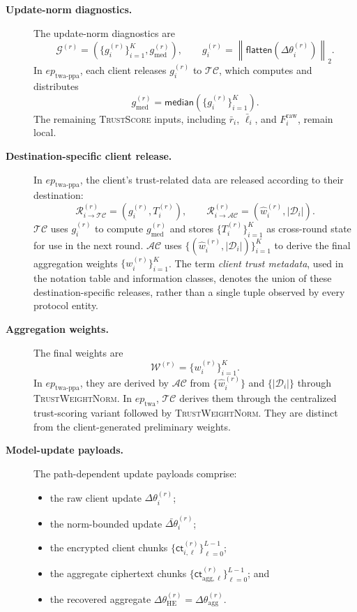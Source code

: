 \documentclass{article}
\begin{document}
\begin{description}
  \item[\textbf{Update-norm diagnostics.}]
  The update-norm diagnostics are
  \[
  \mathcal{G}^{(r)}
  =
  \left(
  \{g_i^{(r)}\}_{i=1}^{K},
  g_{\mathrm{med}}^{(r)}
  \right),
  \qquad
  g_i^{(r)}
  =
  \left\|
  \mathsf{flatten}(\Delta\theta_i^{(r)})
  \right\|_2.
  \]
  In $ep_{\mathrm{twa\text{-}ppa}}$, each client releases
  $g_i^{(r)}$ to $\mathcal{TC}$, which computes and distributes
  \[
  g_{\mathrm{med}}^{(r)}
  =
  \mathsf{median}
  \left(
  \{g_i^{(r)}\}_{i=1}^{K}
  \right).
  \]
  The remaining \textsc{TrustScore} inputs, including
  $\bar r_i$, $\bar\ell_i$, and $F_i^{\mathrm{raw}}$, remain local.

  \item[\textbf{Destination-specific client release.}]
  In $ep_{\mathrm{twa\text{-}ppa}}$, the client's trust-related data are
  released according to their destination:
  \[
  \mathcal{R}_{i\rightarrow\mathcal{TC}}^{(r)}
  =
  \left(
  g_i^{(r)},
  T_i^{(r)}
  \right),
  \qquad
  \mathcal{R}_{i\rightarrow\mathcal{AC}}^{(r)}
  =
  \left(
  \hat{w}_i^{(r)},
  |\mathcal{D}_i|
  \right).
  \]
  $\mathcal{TC}$ uses $g_i^{(r)}$ to compute
  $g_{\mathrm{med}}^{(r)}$ and stores $\{T_i^{(r)}\}_{i=1}^{K}$ as cross-round state for
  use in the next round. $\mathcal{AC}$ uses $\{(\hat w_i^{(r)},|\mathcal{D}_i|)\}_{i=1}^{K}$
  to derive the final aggregation weights $\{w_i^{(r)}\}_{i=1}^{K}$. The term
  \emph{client trust metadata}, used in the notation table and information classes,
  denotes the union of these destination-specific
  releases, rather than a single tuple observed by every protocol entity.

  \item[\textbf{Aggregation weights.}]
  The final weights are
  \[
  \mathcal{W}^{(r)}
  =
  \{w_i^{(r)}\}_{i=1}^{K}.
  \]
  In $ep_{\mathrm{twa\text{-}ppa}}$, they are derived by $\mathcal{AC}$
  from $\{\hat{w}_i^{(r)}\}$ and $\{|\mathcal{D}_i|\}$ through
  \textsc{TrustWeightNorm}. In $ep_{\mathrm{twa}}$, $\mathcal{TC}$ derives
  them through the centralized trust-scoring variant followed by
  \textsc{TrustWeightNorm}. They are distinct from the client-generated
  preliminary weights.

  \item[\textbf{Model-update payloads.}]
  The path-dependent update payloads comprise:
  \begin{itemize}
    \item the raw client update $\Delta\theta_i^{(r)}$;
    \item the norm-bounded update
    $\bar{\Delta\theta}_i^{(r)}$;
    \item the encrypted client chunks
    $\{\mathsf{ct}_{i,\ell}^{(r)}\}_{\ell=0}^{L-1}$;
    \item the aggregate ciphertext chunks
    $\{\mathsf{ct}_{\mathrm{agg},\ell}^{(r)}\}_{\ell=0}^{L-1}$; and
    \item the recovered aggregate
    $\Delta\theta_{\mathrm{HE}}^{(r)}
    =\Delta\theta_{\mathrm{agg}}^{(r)}$.
  \end{itemize}


\end{description}
\end{document}
